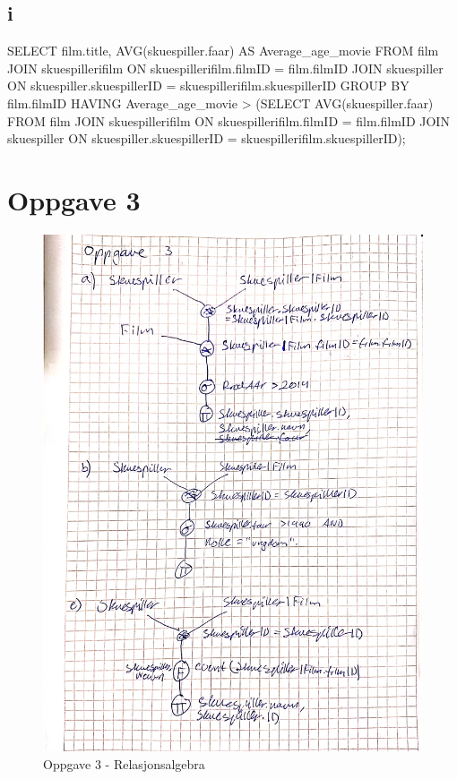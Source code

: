 \documentclass[12pt,a4paper]{article}
\begin{document}
	\subsection{i}
	\begin{spverbatim}
SELECT film.title, AVG(skuespiller.faar) AS Average_age_movie
FROM film JOIN skuespillerifilm ON skuespillerifilm.filmID = film.filmID
JOIN skuespiller ON skuespiller.skuespillerID = skuespillerifilm.skuespillerID
GROUP BY film.filmID
HAVING Average_age_movie > 
(SELECT AVG(skuespiller.faar) FROM film JOIN skuespillerifilm
ON skuespillerifilm.filmID = film.filmID
JOIN skuespiller ON skuespiller.skuespillerID = skuespillerifilm.skuespillerID);
	\end{spverbatim}	
	
	\section{Oppgave 3}
	\begin{figure}[!ht]
		\centering
		\includegraphics[width=\linewidth]{oppgave_3_oving_3.jpg}
		\caption{Oppgave 3 - Relasjonsalgebra}
		\label{fig:oppgave_3}
	\end{figure}		
	\FloatBarrier
\end{document}
